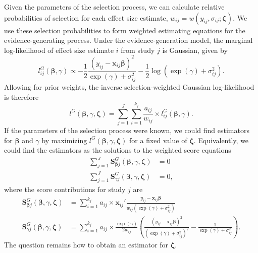 \documentclass[
  man, donotrepeattitle,floatsintext]{apa7}
\begin{document}
Given the parameters of the selection process, we can calculate relative probabilities of selection for each effect size estimate, \(w_{ij} = w(y_{ij}, \sigma_{ij}; \boldsymbol\zeta)\). We use these selection probabilities to form weighted estimating equations for the evidence-generating process. Under the evidence-generation model, the marginal log-likelihood of effect size estimate \(i\) from study \(j\) is Gaussian, given by
\[
l^G_{ij}(\boldsymbol\beta, \gamma) \propto - \frac{1}{2}\frac{(y_{ij} - \mathbf{x}_{ij} \boldsymbol\beta)^2}{\exp(\gamma) + \sigma_{ij}^2} - \frac{1}{2}\log(\exp(\gamma) + \sigma_{ij}^2).
\]
Allowing for prior weights, the inverse selection-weighted Gaussian log-likelihood is therefore
\begin{equation}
l^G(\boldsymbol\beta, \gamma, \boldsymbol\zeta) = \sum_{j=1}^J \sum_{i=1}^{k_j} \frac{a_{ij}} {w_{ij}} \times l^G_{ij}(\boldsymbol\beta, \gamma).
\end{equation}
If the parameters of the selection process were known, we could find estimators for \(\boldsymbol\beta\) and \(\gamma\) by maximizing \(l^G(\boldsymbol\beta, \gamma, \boldsymbol\zeta)\) for a fixed value of \(\boldsymbol\zeta\).
Equivalently, we could find the estimators as the solutions to the weighted score equations
\begin{align}
\sum_{j=1}^J \mathbf{S}^G_{\boldsymbol\beta j} (\boldsymbol\beta, \gamma, \boldsymbol\zeta) &= 0 \label{eq:hybrid-score-beta} \\
\sum_{j=1}^J \mathbf{S}^G_{\gamma j} (\boldsymbol\beta, \gamma, \boldsymbol\zeta) &= 0, \label{eq:hybrid-score-gamma}
\end{align}
where the score contributions for study \(j\) are
\begin{align}
\mathbf{S}^G_{\boldsymbol\beta j} (\boldsymbol\beta, \gamma, \boldsymbol\zeta) &= \sum_{i=1}^{k_j} a_{ij} \times \mathbf{x}_{ij}' \frac{y_{ij} - \mathbf{x}_{ij} \boldsymbol\beta}{w_{ij} \left(\exp(\gamma) + \sigma_{ij}^2\right)} \\
\mathbf{S}^G_{\gamma j} (\boldsymbol\beta, \gamma, \boldsymbol\zeta) &= \sum_{i=1}^{k_j} a_{ij} \times \frac{\exp(\gamma)}{2 w_{ij}} \left(\frac{(y_{ij} -\mathbf{x}_{ij} \boldsymbol\beta)^2}{\left(\exp(\gamma) + \sigma_{ij}^2\right)^2} - \frac{1}{\exp(\gamma) + \sigma_{ij}^2}\right).
\end{align}
The question remains how to obtain an estimator for \(\boldsymbol\zeta\).
\end{document}
